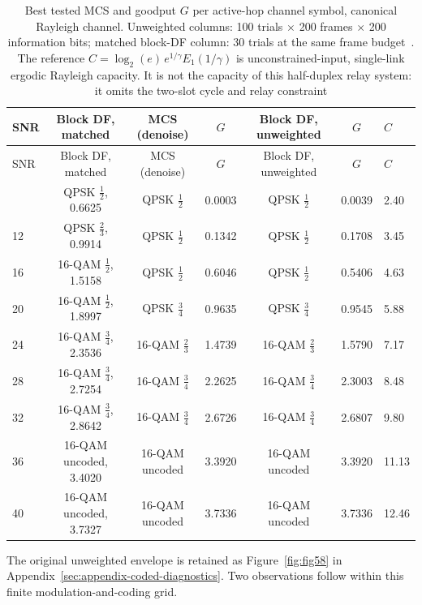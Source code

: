\begingroup\footnotesize
\begin{longtable}[]{@{}lcccccl@{}}
\caption[Link-adaptation envelope: best MCS per SNR]{Best tested MCS and goodput $G$ per active-hop channel symbol, canonical Rayleigh channel. Unweighted columns: 100 trials $\times$ 200 frames $\times$ 200 information bits; matched block-DF column: 30 trials at the same frame budget~. The reference $C=\log_2(e)\,e^{1/\gamma}E_1(1/\gamma)$ is unconstrained-input, single-link ergodic Rayleigh capacity. It is not the capacity of this half-duplex relay system: it omits the two-slot cycle and relay constraint}\label{tbl:table42}\tabularnewline
\toprule\noalign{}
SNR & Block DF, matched & MCS (denoise) & $G$ & Block DF, unweighted & $G$ & $C$ \\
\midrule\noalign{}
\endfirsthead
\toprule\noalign{}
SNR & Block DF, matched & MCS (denoise) & $G$ & Block DF, unweighted & $G$ & $C$ \\
\midrule\noalign{}
\endhead
\bottomrule\noalign{}
\endlastfoot
8 & QPSK $\frac{1}{2}$, 0.6625 & QPSK $\frac{1}{2}$ & 0.0003 & QPSK $\frac{1}{2}$ & 0.0039 & 2.40 \\
12 & QPSK $\frac{2}{3}$, 0.9914 & QPSK $\frac{1}{2}$ & 0.1342 & QPSK $\frac{1}{2}$ & 0.1708 & 3.45 \\
16 & 16-QAM $\frac{1}{2}$, 1.5158 & QPSK $\frac{1}{2}$ & 0.6046 & QPSK $\frac{1}{2}$ & 0.5406 & 4.63 \\
20 & 16-QAM $\frac{1}{2}$, 1.8997 & QPSK  $\frac{3}{4}$ & 0.9635 & QPSK $\frac{3}{4}$ & 0.9545 & 5.88 \\
24 & 16-QAM $\frac{3}{4}$, 2.3536 & 16-QAM  $\frac{2}{3}$ & 1.4739 & 16-QAM $\frac{2}{3}$ & 1.5790 & 7.17 \\
28 & 16-QAM $\frac{3}{4}$, 2.7254 & 16-QAM $\frac{3}{4}$ & 2.2625 & 16-QAM $\frac{3}{4}$ & 2.3003 & 8.48 \\
32 & 16-QAM $\frac{3}{4}$, 2.8642 & 16-QAM  $\frac{3}{4}$ & 2.6726 & 16-QAM $\frac{3}{4}$ & 2.6807 & 9.80 \\
36 & 16-QAM uncoded, 3.4020 & 16-QAM uncoded & 3.3920 & 16-QAM uncoded & 3.3920 & 11.13 \\
40 & 16-QAM uncoded, 3.7327 & 16-QAM uncoded & 3.7336 & 16-QAM uncoded & 3.7336 & 12.46 \\
\end{longtable}
\endgroup

The original unweighted envelope is retained as Figure~\ref{fig:fig58} in Appendix~\ref{sec:appendix-coded-diagnostics}. Two observations follow within this finite modulation-and-coding grid.

